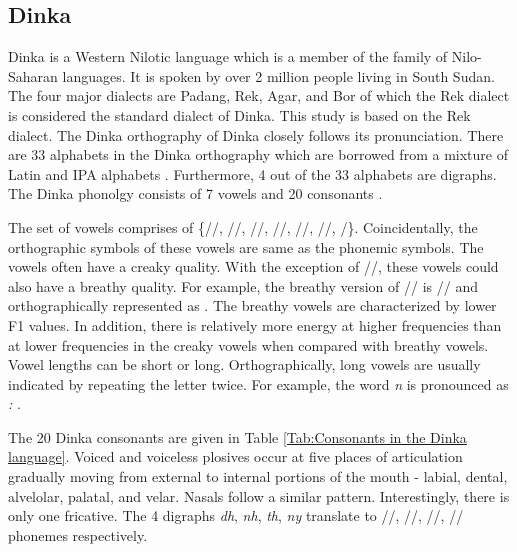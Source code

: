 \documentclass[a4paper]{article}
\begin{document}
\subsection{Dinka}  \vspace{-2mm}
Dinka is a Western Nilotic language which is a member of the family of Nilo-Saharan languages. It is spoken by over 2 million people living in South Sudan. The four major dialects are Padang, Rek, Agar, and Bor of which the Rek dialect is considered the standard dialect of Dinka. This study is based on the Rek dialect. The Dinka orthography of Dinka closely follows its pronunciation. There are 33 alphabets in the Dinka orthography which are borrowed from a mixture of Latin and IPA alphabets \cite{DinkaOmniglot}. Furthermore, 4 out of the 33 alphabets are digraphs. The Dinka phonolgy consists of 7 vowels and 20 consonants \cite{Remijsen-LuanyjangDinka}.

The set of vowels comprises of \{//, //, //, //, //, //, /\}. Coincidentally, the orthographic symbols of these vowels are same as the phonemic symbols. The vowels often have a creaky quality. With the exception of //, these vowels  could also have a breathy quality. For example, the breathy version of // is // and orthographically represented as . The breathy vowels are characterized by lower F1 values. In addition, there is relatively more energy at higher frequencies than at lower frequencies in the creaky vowels when compared with breathy vowels. Vowel lengths can be short or long. Orthographically, long vowels are usually indicated by repeating the letter twice. For example, the word \emph{n} is pronounced as \emph{:} .

The 20 Dinka consonants are given in Table \ref{Tab:Consonants in the Dinka language}. Voiced and voiceless plosives occur at five places of articulation gradually moving from external to internal portions of the mouth - labial, dental, alvelolar, palatal, and velar. Nasals follow a similar pattern. Interestingly, there is only one fricative. The 4 digraphs \emph{dh}, \emph{nh}, \emph{th}, \emph{ny} translate to /\textipa{\|[d}/, /\textipa{\|[n}/, /\textipa{\|[t}/, /\textltailn/ phonemes  respectively.
\end{document}
